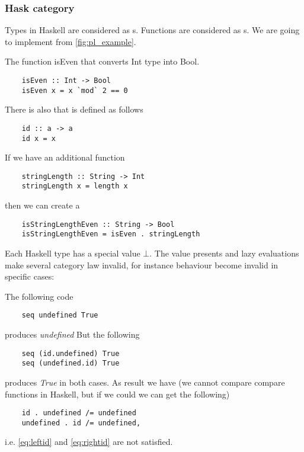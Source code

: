 \subsubsection{\textbf{Hask} category}
\begin{example}
  \label{ex:haskcategory}
  Types in Haskell are considered as s.
  Functions are considered as s.
  We are going to implement  from
  \cref{fig:pl_example}.

  The function isEven that converts Int type
  into Bool.
  \begin{verbatim}
    isEven :: Int -> Bool
    isEven x = x `mod` 2 == 0
  \end{verbatim}

  There is also  that is defined as follows
  \begin{verbatim}
    id :: a -> a
    id x = x
  \end{verbatim}

  If we have an additional function
  \begin{verbatim}
    stringLength :: String -> Int
    stringLength x = length x
  \end{verbatim}
  then we can create a 
  \begin{verbatim}
    isStringLengthEven :: String -> Bool
    isStringLengthEven = isEven . stringLength
  \end{verbatim}

\end{example}

\begin{remark}
  Each Haskell type has a special value $\bot$. The value presents
  and lazy evaluations make several category law invalid, for instance
   behaviour become invalid in specific cases:

  The following code
  \begin{verbatim}
    seq undefined True
  \end{verbatim}
  produces \textit{undefined}
  But the following
  \begin{verbatim}
    seq (id.undefined) True
    seq (undefined.id) True
  \end{verbatim}
  produces \textit{True} in both cases.
  As result we have
  (we cannot compare compare functions in Haskell, but if we
  could we can get the following)
  \begin{verbatim}
    id . undefined /= undefined
    undefined . id /= undefined,
  \end{verbatim}
  i.e. \eqref{eq:leftid} and
  \eqref{eq:rightid} are not satisfied.  
\end{remark}

